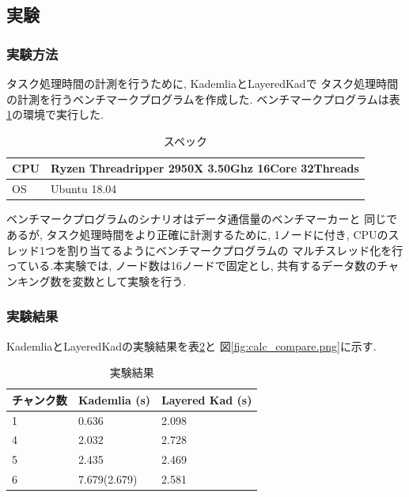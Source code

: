 \documentclass[sotsuron]{jcsie}
\begin{document}
\subsection{実験}
\subsubsection{実験方法}
タスク処理時間の計測を行うために, KademliaとLayeredKadで
タスク処理時間の計測を行うベンチマークプログラムを作成した.
ベンチマークプログラムは表\ref{table:spec-ryzen}の環境で実行した.

\begin{table}[H]
	\caption{スペック}	
	\centering
	\label{table:spec-ryzen}
	\begin{tabular}{|l|l|}
		\hline
		CPU &   
		Ryzen Threadripper 2950X 3.50Ghz 16Core 32Threads \\ 
		\hline	
		OS  &   
		Ubuntu 18.04 \\ 
		\hline
	\end{tabular}	
\end{table}

ベンチマークプログラムのシナリオはデータ通信量のベンチマーカーと
同じであるが, タスク処理時間をより正確に計測するために, 
1ノードに付き, CPUのスレッド1つを割り当てるようにベンチマークプログラムの
マルチスレッド化を行っている.本実験では, ノード数は16ノードで固定とし, 
共有するデータ数のチャンキング数を変数として実験を行う.

\subsubsection{実験結果}
KademliaとLayeredKadの実験結果を表\ref{table:calc-result}と
図\ref{fig:calc_compare.png}に示す.

\begin{table}[H]
	\caption{実験結果}
	\centering
	\label{table:calc-result}
	\begin{tabular}{|l|l|l|}
		\hline
		チャンク数 &   
		Kademlia (s)    &   
		Layered Kad (s)\\ 
		\hline
		1               &   
		0.636           &   
		2.098\\
		\hline
		4               &   
		2.032           &   
		2.728\\
		\hline
		5               &   
		2.435           &   
		2.469\\
		\hline
		6               &   
		7.679(2.679)    &   
		2.581\\
		\hline
	\end{tabular}
\end{table}
\end{document}
